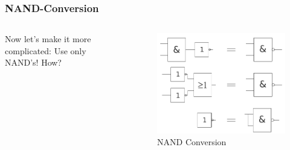 \documentclass{beamer}
\begin{document}
\begin{frame}  \frametitle{NAND-Conversion}
  \begin{columns}
  \begin{column}{5cm}
  Now let's make it more complicated: 
  \newline Use only NAND's! How?
  \newline\newline
  \end{column}
  
  \begin{column}{6cm}
    \begin{figure}[H]
      \centering
      \includegraphics[width=1\textwidth]{nand_conversion}%
      \caption{NAND Conversion}%
      \label{fig:nand_conversion}
    \end{figure}
  \end{column}
  \end{columns}  
\end{frame}
\end{document}
